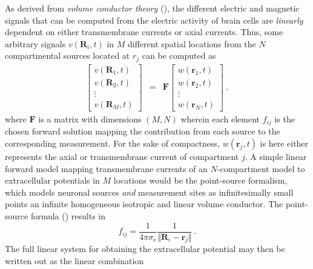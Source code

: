 As derived from \textit{volume conductor theory} (),
the different electric and magnetic signals that can be computed from the electric activity of brain cells are \textit{linearly} dependent on either transmembrane currents or axial currents.
Thus, some arbitrary signals $v(\mathbf{R}_i, t)$ in $M$ different spatial locations from the $N$ compartmental sources located at $r_j$ can be computed as
%
\begin{eqnarray}
\begin{bmatrix}
v(\mathbf{R}_1, t) \\
v(\mathbf{R}_2, t) \\
\vdots \\
v(\mathbf{R}_M, t)
\end{bmatrix}
&=& \mathbf{F}
\begin{bmatrix}
w(\mathbf{r}_1, t) \\
w(\mathbf{r}_2, t) \\
\vdots \\
w(\mathbf{r}_N, t)
\end{bmatrix} ~,
\end{eqnarray}
%
where $\mathbf{F}$ is a matrix with dimensions $(M, N)$ wherein each element $f_{ij}$ is the chosen forward solution mapping the contribution from each source to the corresponding measurement.
For the sake of compactness, $w(\mathbf{r}_j, t)$ is here either represents the axial or transmembrane current of compartment $j$. 
A simple linear forward model mapping transmembrane currents of an $N$-compartment model to extracellular potentials in $M$ locations would be the point-source formalism,
which models neuronal sources \textit{and} measurement sites as infinitesimally small points an infinite homogeneous isotropic and linear volume conductor.
The point-source formula () results in
%
\begin{equation}
f_{ij} = \frac{1}{4\pi\sigma_\mathrm{e}}\frac{1}{\Vert\mathbf{R}_i - \mathbf{r}_j\Vert}  ~.
\end{equation}
%
The full linear system for obtaining the extracellular potential may then be written out as the linear combination
%
